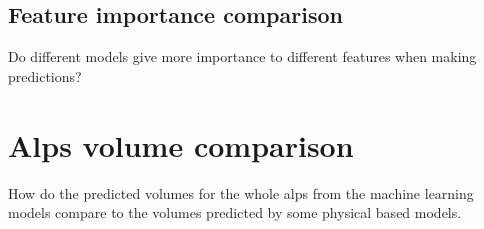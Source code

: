 \subsection{Feature importance comparison}
Do different models give more importance to different features when making predictions?

\section{Alps volume comparison}\label{Alpscomp}
How do the predicted volumes for the whole alps from the machine learning models compare to the volumes predicted by some physical based models.

%
%
%
